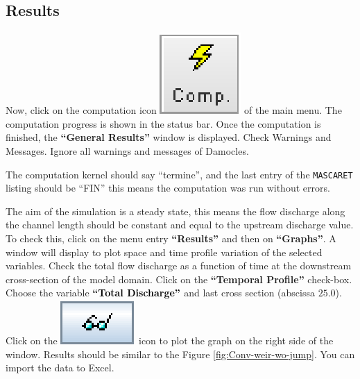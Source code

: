 \documentclass[a4paper,12pt]{article}
\begin{document}
\newpage

\subsection{Results}

\hspace{0.5cm} Now, click on the computation icon \includegraphics[scale=0.6]{compute} of
the main menu. The computation progress is shown in the status bar.
Once the computation is finished, the \textbf{{}``General Results''}
window is displayed. Check Warnings and Messages. Ignore
all warnings and messages of Damocles.

\vspace{0.5cm}

The computation kernel should say {}``termine'', and the last entry
of the \texttt{MASCARET} listing should be {}``FIN'' this means the computation was run without errors.

\vspace{0.5cm}

The aim of the simulation is a steady state, this means the flow discharge along the channel length should be constant and equal to the upstream discharge value. To check this, click
on the menu entry \textbf{{}``Results''} and then on \textbf{{}``Graphs''}.
A window will display to plot space and time profile variation of the selected variables. Check the total flow discharge
as a function of time at the downstream cross-section of the model domain. Click on the \textbf{{}``Temporal Profile''} check-box. Choose
the variable\textcolor{red}{{} }\textbf{\textcolor{black}{{}``Total
Discharge'' }}and last cross section (abscissa $25.0$). Click on
the \includegraphics[scale=0.6]{show}
icon to plot the graph on the right side of the window.
Results should be similar to the Figure \ref{fig:Conv-weir-wo-jump}.
You can import the data to Excel. 
\end{document}
